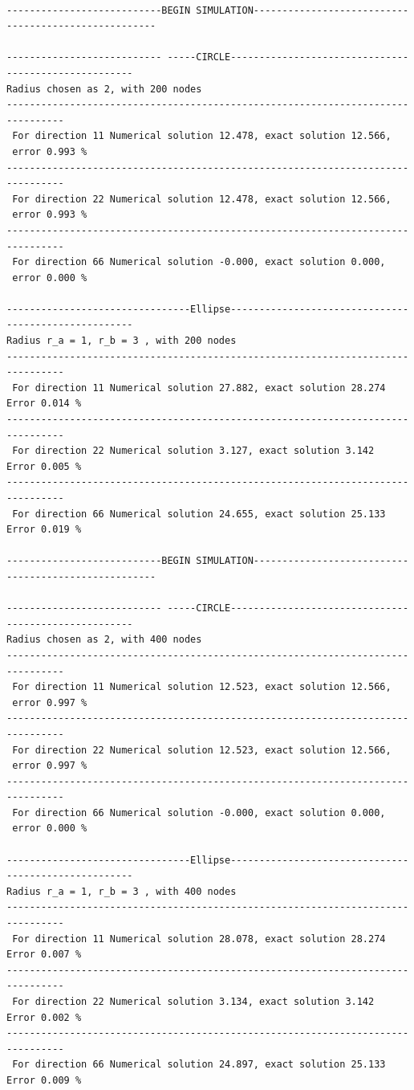 \documentclass[a4paper,norsk]{article}
\begin{document}
\newpage
\begin{lstlisting}[style=terminal]

---------------------------BEGIN SIMULATION-----------------------------------------------------

--------------------------- -----CIRCLE-----------------------------------------------------
Radius chosen as 2, with 200 nodes
--------------------------------------------------------------------------------
 For direction 11 Numerical solution 12.478, exact solution 12.566, 
 error 0.993 %
--------------------------------------------------------------------------------
 For direction 22 Numerical solution 12.478, exact solution 12.566, 
 error 0.993 %
--------------------------------------------------------------------------------
 For direction 66 Numerical solution -0.000, exact solution 0.000, 
 error 0.000 %

--------------------------------Ellipse-----------------------------------------------------
Radius r_a = 1, r_b = 3 , with 200 nodes
--------------------------------------------------------------------------------
 For direction 11 Numerical solution 27.882, exact solution 28.274
Error 0.014 %
--------------------------------------------------------------------------------
 For direction 22 Numerical solution 3.127, exact solution 3.142
Error 0.005 %
--------------------------------------------------------------------------------
 For direction 66 Numerical solution 24.655, exact solution 25.133
Error 0.019 %

---------------------------BEGIN SIMULATION-----------------------------------------------------

--------------------------- -----CIRCLE-----------------------------------------------------
Radius chosen as 2, with 400 nodes
--------------------------------------------------------------------------------
 For direction 11 Numerical solution 12.523, exact solution 12.566, 
 error 0.997 %
--------------------------------------------------------------------------------
 For direction 22 Numerical solution 12.523, exact solution 12.566, 
 error 0.997 %
--------------------------------------------------------------------------------
 For direction 66 Numerical solution -0.000, exact solution 0.000, 
 error 0.000 %

--------------------------------Ellipse-----------------------------------------------------
Radius r_a = 1, r_b = 3 , with 400 nodes
--------------------------------------------------------------------------------
 For direction 11 Numerical solution 28.078, exact solution 28.274
Error 0.007 %
--------------------------------------------------------------------------------
 For direction 22 Numerical solution 3.134, exact solution 3.142
Error 0.002 %
--------------------------------------------------------------------------------
 For direction 66 Numerical solution 24.897, exact solution 25.133
Error 0.009 %

\end{lstlisting}
\end{document}

